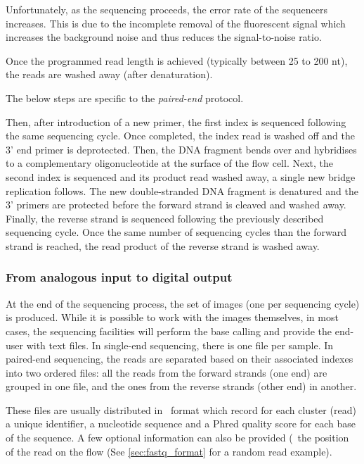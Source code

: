 Unfortunately, as the sequencing proceeds, the error rate of the sequencers
increases. This is due to the incomplete removal of the fluorescent signal which
increases the background noise and thus reduces the signal-to-noise ratio.

Once the programmed read length is achieved (typically between 25 to 200 nt),
the reads are washed away (after denaturation).

\NB The below steps are specific to the \emph{paired-end} protocol.

Then, after introduction of a new primer, the first index is sequenced
following the same sequencing cycle.
Once completed, the index read is washed off and the 3' end primer is deprotected.
Then, the \gls{DNA} fragment bends over and hybridises to a complementary
oligonucleotide at the surface of the flow cell.
Next, the second index is sequenced and its product read washed away,
a single new bridge replication follows.
The new double-stranded \gls{DNA} fragment is denatured and the 3' primers are
protected before the forward strand is cleaved and washed away.
Finally, the reverse strand is sequenced following the previously described
sequencing cycle. Once the same number of sequencing cycles than the forward
strand is reached, the read product of the reverse strand is washed away.

\subsubsection{From analogous input to digital output}

At the end of the sequencing process, the set of images (one per sequencing cycle)
is produced. While it is possible to work with the images themselves, in most
cases, the sequencing facilities will perform the base calling and provide the
end-user with text files. In single-end sequencing, there is one file per sample.
In paired-end sequencing, the reads are separated based on their associated
indexes into two ordered files: all the reads from the forward strands (one end)
are grouped in one file, and the ones from the reverse strands (other end)
in another.

These files are usually distributed in \fastq\ format
 which record for each cluster (read) a unique identifier,
a nucleotide sequence and a \gls{Phred} quality score for each base of the
sequence. A few optional information can also be provided (\eg\
the position of the read on the \gls{flow} (See \cref{sec:fastq_format} for
a random read example).

